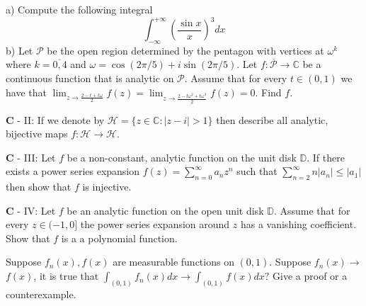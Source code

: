 \documentclass[14pt]{extarticle}
\begin{document}
a) Compute the following integral
$$
\int_{-\infty}^{+\infty}\left(\frac{\sin x}{x}\right)^{3} d x
$$
b) Let $\mathcal{P}$ be the open region determined by the pentagon with vertices at $\omega^{k}$ where $k=\overline{0,4}$ and $\omega=\cos (2 \pi / 5)+i \sin (2 \pi / 5)$. Let $f: \overline{\mathcal{P}} \rightarrow \mathbb{C}$ be a continuous function that is analytic on $\mathcal{P}$. Assume that for every $t \in(0,1)$ we have that $\lim _{z \rightarrow \frac{2-t+t \omega}{2}} f(z)=\lim _{z \rightarrow \frac{2-t \omega^{2}+t \omega^{3}}{2}} f(z)=0$. Find $f$.
\newpage

$\mathbf{C}$ - II: If we denote by $\mathcal{H}=\{z \in \mathbb{C}:|z-i|>1\}$ then describe all analytic, bijective maps $f: \mathcal{H} \rightarrow \mathcal{H}$.
\newpage

$\mathbf{C}$ - III: Let $f$ be a non-constant, analytic function on the unit disk $\mathbb{D}$. If there exists a power series expansion $f(z)=\sum_{n=0}^{\infty} a_{n} z^{n}$ such that $\sum_{n=2}^{\infty} n\left|a_{n}\right| \leq\left|a_{1}\right|$ then show that $f$ is injective.
\newpage

$\mathbf{C}$ - IV: Let $f$ be an analytic function on the open unit disk $\mathbb{D}$. Assume that for every $z \in(-1,0]$ the power series expansion around $z$ has a vanishing coefficient. Show that $f$ is a a polynomial function.
\newpage

Suppose $f_{n}(x), f(x)$ are measurable functions on $(0,1)$. Suppose $f_{n}(x) \rightarrow$ $f(x)$, it is true that $\int_{(0,1)} f_{n}(x) d x \rightarrow \int_{(0,1)} f(x) d x ?$ Give a proof or a counterexample.
\newpage
\end{document}
